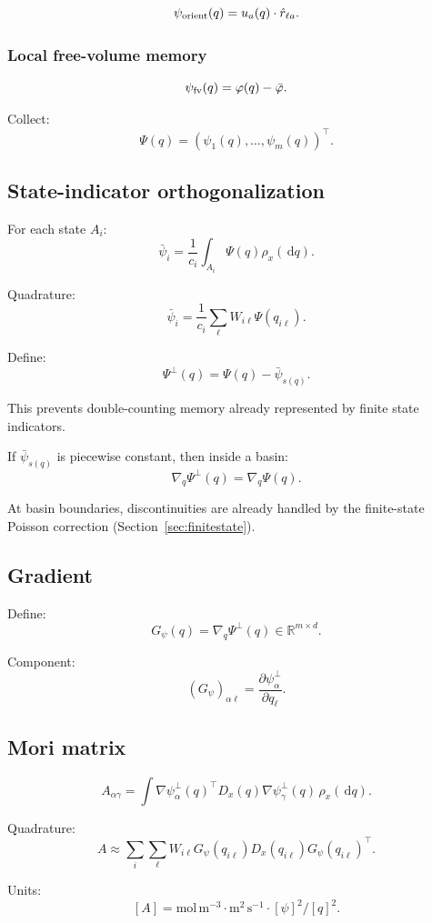 \documentclass[11pt]{article}
\newcommand{\dd}{\,\mathrm d}
\newcommand{\R}{\mathbb R}
\begin{document}
\[
\psi_{\rm orient}(q)
=
u_a(q)\cdot \hat r_{\ell a}.
\]

\subsubsection{Local free-volume memory}

\[
\psi_{\rm fv}(q)
=
\varphi(q)-\bar\varphi.
\]

Collect:
\[
\Psi(q)
=
(\psi_1(q),\ldots,\psi_m(q))^\top.
\]

\subsection{State-indicator orthogonalization}

For each state \(A_i\):
\[
\bar\psi_i
=
\frac{1}{c_i}
\int_{A_i}\Psi(q)\rho_x(\dd q).
\]

Quadrature:
\[
\bar\psi_i
=
\frac{1}{c_i}
\sum_{\ell}W_{i\ell}\Psi(q_{i\ell}).
\]

Define:
\[
\Psi^\perp(q)=\Psi(q)-\bar\psi_{s(q)}.
\]

This prevents double-counting memory already represented by finite state
indicators.

If \(\bar\psi_{s(q)}\) is piecewise constant, then inside a basin:
\[
\nabla_q\Psi^\perp(q)=\nabla_q\Psi(q).
\]

At basin boundaries, discontinuities are already handled by the finite-state
Poisson correction (Section~\ref{sec:finitestate}).

\subsection{Gradient}

Define:
\[
G_\psi(q)
=
\nabla_q\Psi^\perp(q)
\in\R^{m\times d}.
\]

Component:
\[
(G_\psi)_{\alpha\ell}
=
\frac{\partial\psi_\alpha^\perp}{\partial q_\ell}.
\]

\subsection{Mori matrix}

\[
A_{\alpha\gamma}
=
\int
\nabla\psi_\alpha^\perp(q)^\top
D_x(q)
\nabla\psi_\gamma^\perp(q)
\,\rho_x(\dd q).
\]

Quadrature:
\[
A
\approx
\sum_i\sum_{\ell}
W_{i\ell}
G_\psi(q_{i\ell})
D_x(q_{i\ell})
G_\psi(q_{i\ell})^\top.
\]

Units:
\[
[A]=\mathrm{mol\,m^{-3}}\cdot \mathrm{m^2\,s^{-1}}\cdot [\psi]^2/[q]^2.
\]
\end{document}

